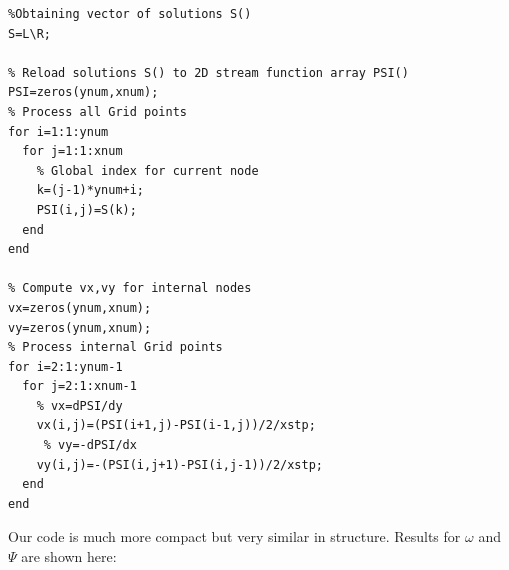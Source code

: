 \begin{lstlisting}
%Obtaining vector of solutions S()
S=L\R;

% Reload solutions S() to 2D stream function array PSI()
PSI=zeros(ynum,xnum);
% Process all Grid points
for i=1:1:ynum
  for j=1:1:xnum
    % Global index for current node
    k=(j-1)*ynum+i;
    PSI(i,j)=S(k);
  end
end

% Compute vx,vy for internal nodes
vx=zeros(ynum,xnum);
vy=zeros(ynum,xnum);
% Process internal Grid points
for i=2:1:ynum-1
  for j=2:1:xnum-1
    % vx=dPSI/dy
    vx(i,j)=(PSI(i+1,j)-PSI(i-1,j))/2/xstp;
     % vy=-dPSI/dx
    vy(i,j)=-(PSI(i,j+1)-PSI(i,j-1))/2/xstp;
  end
end

\end{lstlisting}

Our code is much more compact but very similar in structure.
Results for $\omega$ and $\Psi$ are shown here:

